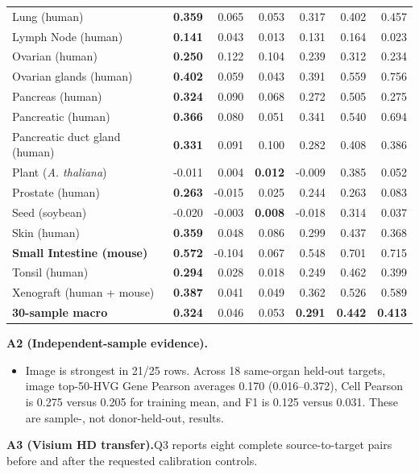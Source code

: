 \documentclass[10pt]{article}
\begin{document}
\begin{center}
\begin{tabular*}{\linewidth}{@{\extracolsep{\fill}}lrrrrrr@{}}
Lung (human) & \textbf{0.359} & 0.065 & 0.053 & 0.317 & 0.402 & 0.457 \\
Lymph Node (human) & \textbf{0.141} & 0.043 & 0.013 & 0.131 & 0.164 & 0.023 \\
Ovarian (human) & \textbf{0.250} & 0.122 & 0.104 & 0.239 & 0.312 & 0.234 \\
Ovarian glands (human) & \textbf{0.402} & 0.059 & 0.043 & 0.391 & 0.559 & 0.756 \\
Pancreas (human) & \textbf{0.324} & 0.090 & 0.068 & 0.272 & 0.505 & 0.275 \\
Pancreatic (human) & \textbf{0.366} & 0.080 & 0.051 & 0.341 & 0.540 & 0.694 \\
Pancreatic duct gland (human) & \textbf{0.331} & 0.091 & 0.100 & 0.282 & 0.408 & 0.386 \\
Plant (\textit{A. thaliana}) & -0.011 & 0.004 & \textbf{0.012} & -0.009 & 0.385 & 0.052 \\
Prostate (human) & \textbf{0.263} & -0.015 & 0.025 & 0.244 & 0.263 & 0.083 \\
Seed (soybean) & -0.020 & -0.003 & \textbf{0.008} & -0.018 & 0.314 & 0.037 \\
Skin (human) & \textbf{0.359} & 0.048 & 0.086 & 0.299 & 0.437 & 0.368 \\
\textbf{Small Intestine (mouse)} & \textbf{0.572} & -0.104 & 0.067 & 0.548 & 0.701 & 0.715 \\
Tonsil (human) & \textbf{0.294} & 0.028 & 0.018 & 0.249 & 0.462 & 0.399 \\
Xenograft (human + mouse) & \textbf{0.387} & 0.041 & 0.049 & 0.362 & 0.526 & 0.589 \\
\midrule
\textbf{30-sample macro} & \textbf{0.324} & 0.046 & 0.053 &
\textbf{0.291} & \textbf{0.442} & \textbf{0.413} \\
\bottomrule
\end{tabular*}

\endgroup
\end{center}

\textbf{A2 (Independent-sample evidence).}
\begin{itemize}
\item Image is strongest in 21/25 rows. Across 18 same-organ held-out targets,
image
top-50-HVG Gene Pearson averages 0.170 (0.016--0.372), Cell Pearson is 0.275
versus 0.205 for training mean, and F1 is 0.125 versus 0.031. These are sample-,
not donor-held-out, results.
\end{itemize}

\textbf{A3 (Visium HD transfer).}\enspace Q3 reports eight complete
source-to-target pairs before and after the requested calibration controls.
\end{document}
